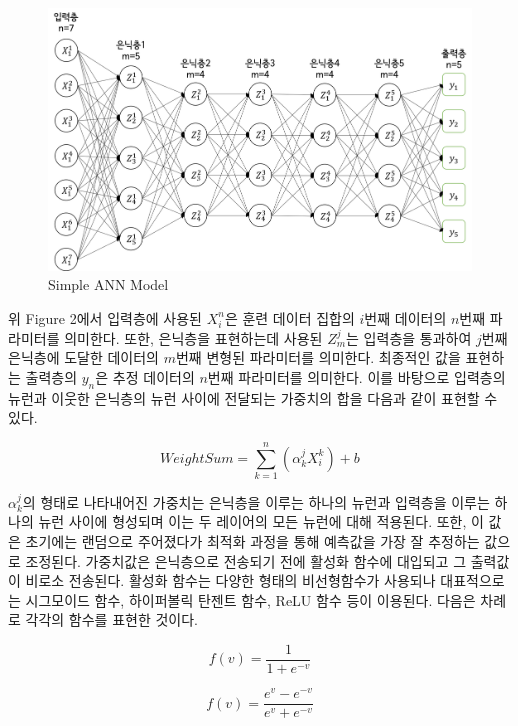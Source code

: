 \documentclass{article}
\begin{document}
\begin{figure}[h]
\centering
\includegraphics[scale=0.3]{./fig/Figure_2.png}
\caption{Simple ANN Model}
\label{fig_2}
\end{figure}

위 Figure 2에서 입력층에 사용된 $X_i^n$은 훈련 데이터 집합의 $i$번째 데이터의 $n$번째 파라미터를 의미한다. 또한, 은닉층을 표현하는데 사용된 $Z_m^j$는 입력층을 통과하여 $j$번째 은닉층에 도달한 데이터의 $m$번째 변형된 파라미터를 의미한다. 최종적인 값을 표현하는 출력층의 $y_n$은 추정 데이터의 $n$번째 파라미터를 의미한다. 이를 바탕으로 입력층의 뉴런과 이웃한 은닉층의 뉴런 사이에 전달되는 가중치의 합을 다음과 같이 표현할 수 있다.

\begin{equation}
Weight Sum = \sum_{k=1}^{n}(\alpha_k^j X_i^k)+b
\end{equation}

$\alpha_k^j$의 형태로 나타내어진 가중치는 은닉층을 이루는 하나의 뉴런과 입력층을 이루는 하나의 뉴런 사이에 형성되며 이는 두 레이어의 모든 뉴런에 대해 적용된다. 또한, 이 값은 초기에는 랜덤으로 주어졌다가 최적화 과정을 통해 예측값을 가장 잘 추정하는 값으로 조정된다. 가중치값은 은닉층으로 전송되기 전에 활성화 함수에 대입되고 그 출력값이 비로소 전송된다. 활성화 함수는 다양한 형태의 비선형함수가 사용되나 대표적으로는 시그모이드 함수, 하이퍼볼릭 탄젠트 함수, ReLU 함수 등이 이용된다. 다음은 차례로 각각의 함수를 표현한 것이다.

\begin{equation}
f(v)=\frac{1}{1+e^{-v}}
\end{equation}

\begin{equation}
f(v)=\frac{e^v-e^{-v}}{e^v+e^{-v}}
\end{equation}
\end{document}
